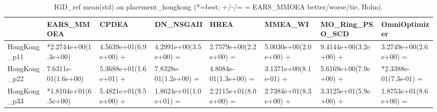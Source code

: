 \begin{table}[t]
\centering
\caption{IGD_ref mean(std) on placement_hongkong (*=best; +/-/= = EARS_MMOEA better/worse/tie, Holm).}
\label{tab:placement_hongkong_IGD_ref}
\begin{tabular}{llllllll}
\toprule
 & EARS\_MMOEA & CPDEA & DN\_NSGAII & HREA & MMEA\_WI & MO\_Ring\_PSO\_SCD & OmniOptimizer \\
\midrule
HongKong\_p11 & *2.2744e+00(1.3e+00) & 4.5639e+01(6.9e+00) + & 4.2991e+00(3.5e+00) = & 2.7579e+00(2.2e+00) = & 5.0030e+00(2.0e+00) + & 9.4144e+00(3.2e+00) + & 3.2749e+00(2.6e+00) = \\
HongKong\_p22 & 7.6311e-01(1.6e+00) & 5.3688e+01(1.6e+01) + & 7.8328e-01(1.2e+00) = & 4.8084e-01(1.3e+00) = & 3.1371e+00(8.1e-01) + & 5.6169e+00(7.9e+00) + & *2.3388e-01(7.3e-01) = \\
HongKong\_p33 & *1.8104e+01(6.5e+00) & 5.4821e+01(9.5e+00) + & 1.8624e+01(1.0e+01) = & 2.2115e+01(8.0e+00) = & 2.7384e+01(8.3e+00) + & 3.3125e+01(5.9e+00) + & 1.8753e+01(8.6e+00) = \\
\bottomrule
\end{tabular}
\end{table}
